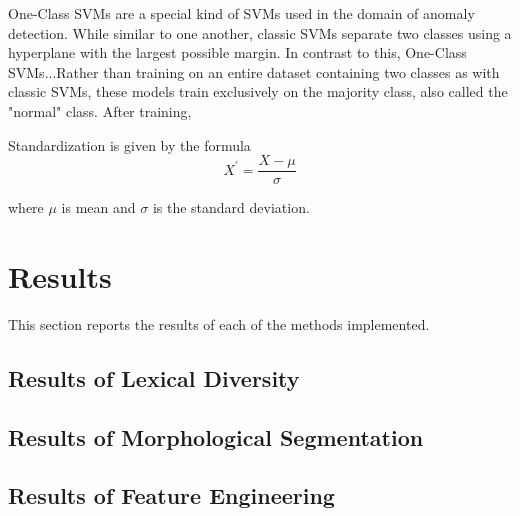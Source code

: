 \documentclass[12pt,a4paper]{article}
\numberwithin{figure}{section}
\numberwithin{table}{section}
\numberwithin{definition}{section}
\begin{document}
One-Class SVMs are a special kind of SVMs used in the domain of anomaly detection. While similar to one another, classic SVMs separate two classes using a hyperplane with the largest possible margin. In contrast to this, One-Class SVMs...Rather than training on an entire dataset containing two classes as with classic SVMs, these models train exclusively on the majority class, also called the "normal" class. After training,  

Standardization is given by the formula \[X^{\prime} = \frac{X - \mu}{\sigma}\] 

where $\mu$ is mean and $\sigma$ is the standard deviation.

\newpage
\section{Results}
\label{sec:results}

This section reports the results of each of the methods implemented.

\subsection{Results of Lexical Diversity}
\label{ssec:lexicaldiversityresults}


\subsection{Results of Morphological Segmentation}
\label{ssec:morphologicalsegmentationresults}

\subsection{Results of Feature Engineering}
\label{ssec:featureengineeringresults}
\end{document}

